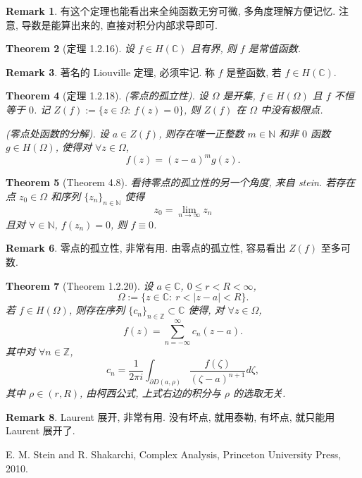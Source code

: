 \documentclass[a4paper,11pt]{article}
\newtheorem{theorem}{Theorem}[section]
\theoremstyle{definition}
\newtheorem{remark}[theorem]{Remark}
\begin{document}
\begin{CJK*}{UTF8}{gbsn}
\begin{remark}
    有这个定理也能看出来全纯函数无穷可微, 多角度理解方便记忆.
    注意, 导数是能算出来的, 直接对积分内部求导即可.
\end{remark}

\begin{theorem}[定理 1.2.16]
    设 $ f \in H(\mathbb{C}) $ 且有界, 则 $ f $ 是常值函数.
\end{theorem}

\begin{remark}
    著名的 Liouville 定理, 必须牢记. 
    称 $ f $ 是整函数, 若 $ f \in H(\mathbb{C}) $.
\end{remark}

\begin{theorem}[定理 1.2.18]
    (零点的孤立性). 设 $ \Omega $ 是开集, $ f \in H(\Omega) $ 且 $ f $ 不恒等于 $ 0 $.
    记 $ Z(f) := \{z \in \Omega :\ f(z) = 0\} $, 则 $ Z(f) $ 在 $ \Omega $ 中没有极限点.
    
    (零点处函数的分解). 设 $ a \in Z(f) $, 则存在唯一正整数 $ m \in \mathbb{N} $ 
    和非 $ 0 $ 函数 $ g \in H(\Omega) $, 使得对 $ \forall z \in \Omega $,
    $$
        f(z) = (z - a)^m g(z).
    $$
\end{theorem}

\begin{theorem}[Theorem 4.8]
    看待零点的孤立性的另一个角度, 来自 stein.
    若存在点 $ z_0 \in \Omega $ 和序列 $ \{z_n\}_{n \in \mathbb{N}} $ 使得
    $$
        z_0 = \lim_{n \to \infty} z_n
    $$
    且对 $ \forall \in \mathbb{N} $, $ f(z_n) = 0 $, 则 $ f \equiv 0 $.
\end{theorem}

\begin{remark}
    零点的孤立性, 非常有用. 由零点的孤立性, 容易看出 $ Z(f) $ 至多可数.
\end{remark}

\begin{theorem}[Theorem 1.2.20]
    设 $ a \in \mathbb{C} $, $ 0 \leq r < R < \infty $, 
    $$ \Omega := \{z \in \mathbb{C} :\ r < |z - a| < R \}. $$
    若 $ f \in H(\Omega) $, 则存在序列 $ \{c_n\}_{n \in \mathbb{Z}} \subset \mathbb{C} $ 使得, 
    对 $ \forall z \in \Omega $,
    $$
        f(z) = \sum_{n=-\infty}^\infty c_n (z - a).
    $$
    其中对 $ \forall n \in \mathbb{Z} $,
    $$
        c_n = \frac{1}{2 \pi i} \int_{\partial D(a, \rho)} \frac{f(\zeta)}{(\zeta - a)^{n+1}} d\zeta,
    $$
    其中 $ \rho \in (r, R) $, 由柯西公式, 上式右边的积分与 $ \rho $ 的选取无关.
\end{theorem}

\begin{remark}
    Laurent 展开, 非常有用. 没有坏点, 就用泰勒, 有坏点, 就只能用 Laurent 展开了.
\end{remark}

\begin{thebibliography}{99}

      E. M. Stein and R. Shakarchi, Complex Analysis, Princeton University Press, 2010.
    
\end{thebibliography}

\end{CJK*}
\end{document}
